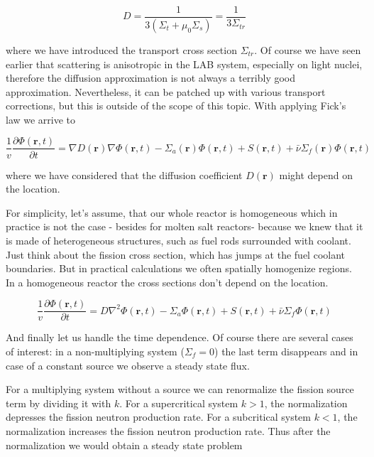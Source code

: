 \begin{equation}
D=\frac{1}{3(\Sigma_t+\mu_0\Sigma_s)}=\frac{1}{3\Sigma_{tr}}
\end{equation}

\noindent where we have introduced the transport cross section $\Sigma_{tr}$. Of course we have seen earlier that scattering is anisotropic in the LAB system, especially on light nuclei, therefore the diffusion approximation is not always a terribly good approximation. Nevertheless, it can be patched up with various transport corrections, but this is outside of the scope of this topic. With applying Fick's law we arrive to

\begin{equation}
\frac{1}{v}\frac{\partial\Phi(\mathbf{r},t)}{\partial t}=\nabla D(\mathbf{r})\nabla \Phi(\mathbf{r},t)-\Sigma_a(\mathbf{r})\Phi(\mathbf{r},t)+S(\mathbf{r},t) 
+\bar\nu\Sigma_f(\mathbf{r})\Phi(\mathbf{r},t)
\end{equation}

\noindent where we have considered that the diffusion coefficient $D(\mathbf{r})$ might depend on the location. 

For simplicity, let's assume, that our whole reactor is homogeneous which in practice is not the case - besides for molten salt reactors- because we knew that it is made of heterogeneous structures, such as fuel rods surrounded with coolant. Just think about the fission cross section, which has jumps at the fuel coolant boundaries. But in practical calculations we often spatially homogenize regions. In a homogeneous reactor the cross sections don't depend on the location. 

\begin{equation}
\frac{1}{v}\frac{\partial\Phi(\mathbf{r},t)}{\partial t}=D\nabla^2 \Phi(\mathbf{r},t)-\Sigma_a\Phi(\mathbf{r},t)+S(\mathbf{r},t) 
+\bar\nu\Sigma_f\Phi(\mathbf{r},t)
\end{equation}

And finally let us handle the time dependence. Of course there are several cases of interest: in a non-multiplying system ($\Sigma_f=0$) the last term disappears and in case of a constant source we observe a steady state flux. 

For a multiplying system without a source we can renormalize the fission source term by dividing it with $k$. For a supercritical system $k > 1$, the normalization depresses the fission neutron production rate. For a subcritical system $k < 1$, the normalization increases the fission neutron production rate. Thus after the normalization we would obtain a steady state problem

